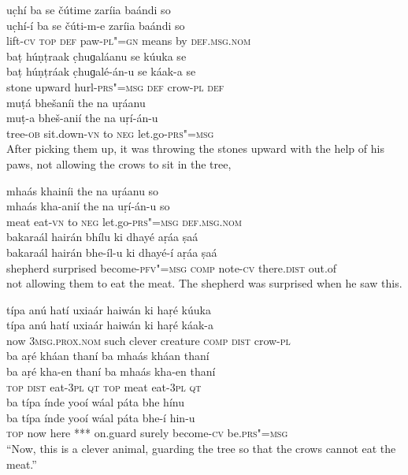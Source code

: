 \begin{exe}
\ex
\label{ex:13}
\glll uc̣hí	ba	se	čútime	zaríia	baándi	so \\
uc̣hí-í	ba	se	čúti-m-e	zaríia	baándi	so \\
lift-\textsc{cv} \textsc{top} \textsc{def}	paw-\textsc{pl"=gn}	means	by	\textsc{def.msg.nom} \\
\glll baṭ	húṇṭraak	c̣huɡaláanu	se	kúuka	se \\
baṭ	húṇṭráak	c̣huɡalé-án-u	se	káak-a	se \\
stone	upward	hurl-\textsc{prs"=msg} \textsc{def}	crow-\textsc{pl} \textsc{def} \\
\glll muṭá bhešaníi	the	na	uṛáanu \\
muṭ-a	bheš-anií	the	na	uṛí-án-u \\
tree-\textsc{ob}	sit.down-\textsc{vn}	to	\textsc{neg}	let.go-\textsc{prs"=msg} \\
\glt After picking them up, it was throwing the stones upward with the help of his paws, not allowing the crows to sit in the tree,

\ex
\label{ex:14}
\glll mhaás	khainíi	the	na	uṛáanu	so \\
mhaás	kha-anií	the	na	uṛí-án-u	so \\
meat	eat-\textsc{vn}	to \textsc{neg}	let.go-\textsc{prs"=msg} \textsc{def.msg.nom} \\
\glll bakaraál	hairán	bhílu	ki	dhayé aṛáa	ṣaá \\
bakaraál	hairán	bhe-íl-u	ki	dhayé-í aṛáa	ṣaá \\
shepherd	surprised	become-\textsc{pfv"=msg} \textsc{comp}	note-\textsc{cv} there.\textsc{dist}	out.of \\
\glt not allowing them to eat the meat. The shepherd was surprised when he saw this.

\ex
\label{ex:15}
\glll típa	anú	hatí	uxiaár	haiwán	ki	haṛé	kúuka \\
típa	anú	hatí	uxiaár	haiwán	ki	haṛé	káak-a \\
now \textsc{3msg.prox.nom}	such	clever	creature	\textsc{comp} \textsc{dist}	crow-\textsc{pl} \\
\glll ba	aṛé	kháan	thaní	ba	mhaás	kháan	thaní \\
ba	aṛé	kha-en	thaní	ba	mhaás	kha-en	thaní \\
\textsc{top}  \textsc{dist}	eat-\textsc{3pl} \textsc{qt} \textsc{top}	meat	eat-\textsc{3pl} \textsc{qt} \\
\glll ba	típa	índe	yooí	wáal	páta	bhe	hínu \\
ba	típa	índe	yooí	wáal	páta	bhe-í	hin-u \\
\textsc{top}	now	here	***	on.guard	surely	become-\textsc{cv}	be.\textsc{prs"=msg} \\
\glt “Now, this is a clever animal, guarding the tree so that the crows cannot eat the meat.”


\end{exe}
